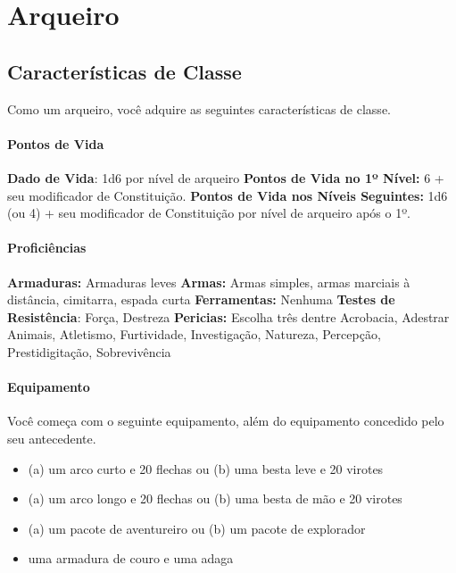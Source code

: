 \chapter{Arqueiro}%
\label{cha:arqueiro}
\begin{multicols}{2}

\section*{Características de Classe}%

Como um arqueiro, você adquire as seguintes características de classe.

\subsubsection{Pontos de Vida}%

\noindent\textbf{Dado de Vida}: 1d6 por nível de arqueiro \nl
\textbf{Pontos de Vida no 1º Nível:} 6 + seu modificador de Constituição. \nl
\textbf{Pontos de Vida nos Níveis Seguintes:} 1d6 (ou 4) + seu modificador de
Constituição por nível de arqueiro após o 1º.

\subsubsection{Proficiências}%

\noindent\textbf{Armaduras:} Armaduras leves \nl
\textbf{Armas:} Armas simples, armas marciais à distância, cimitarra, espada
curta \nl
\textbf{Ferramentas:} Nenhuma \jump
\textbf{Testes de Resistência}: Força, Destreza \nl
\textbf{Pericias:} Escolha três dentre Acrobacia, Adestrar Animais, Atletismo,
Furtividade, Investigação, Natureza, Percepção, Prestidigitação, Sobrevivência

\subsubsection{Equipamento}%

Você começa com o seguinte equipamento, além do equipamento concedido pelo seu
antecedente.
\begin{itemize}
    \item (a) um arco curto e 20 flechas ou (b) uma besta leve e 20 virotes
    \item (a) um arco longo e 20 flechas ou (b) uma besta de mão e 20 virotes
    \item (a) um pacote de aventureiro ou (b) um pacote de explorador
    \item uma armadura de couro e uma adaga
\end{itemize}


\end{multicols}
